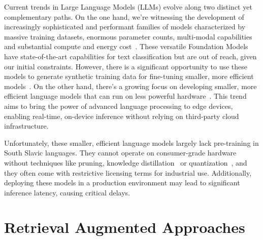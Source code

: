 Current trends in Large Language Models (LLMs) evolve along two distinct yet complementary paths. 
On the one hand, we're witnessing the development of increasingly sophisticated and performant families of models characterized by massive training datasets, enormous parameter counts, multi-modal capabilities~\parencite{openai2024gpt4technicalreport, dubey2024llama3herdmodels, geminiteam2024geminifamilyhighlycapable} and substantial compute and energy cost~\parencite{rae2021scaling, thoppilan2022lamda}.
These versatile Foundation Models have state-of-the-art capabilities for text classification but are out of reach, given our initial constraints.
However, there is a significant opportunity to use these models to generate synthetic training data for fine-tuning smaller, more efficient models~\parencite{kuzman2023chatgptbeginningendmanual}.
On the other hand, there's a growing focus on developing smaller, more efficient language models that can run on less powerful hardware~\parencite{li2024DataCompLM, gemma_2024, abdin2024phi3technicalreporthighly, jiang2023mistral7b, parmar2024nemotron415btechnicalreport}. 
This trend aims to bring the power of advanced language processing to edge devices, enabling real-time, on-device inference without relying on third-party cloud infrastructure. 

Unfortunately, these smaller, efficient language models largely lack pre-training in South Slavic languages. 
They cannot operate on consumer-grade hardware without techniques like pruning, knowledge distillation~\parencite{muralidharan2024compact, hinton2015distillingknowledgeneuralnetwork, gu2024minillmknowledgedistillationlarge} or quantization~\parencite{nagel2021whitepaperneuralnetwork, gholami2021surveyquantizationmethodsefficient, malinovskii2024pvtuningstraightthroughestimationextreme}, and they often come with restrictive licensing terms for industrial use. 
Additionally, deploying these models in a production environment may lead to significant inference latency, causing critical delays.

\section{Retrieval Augmented Approaches}

